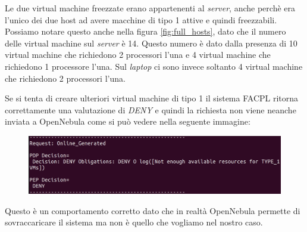 Le due virtual machine freezzate erano appartenenti al \emph{server}, anche perchè era l'unico dei due host ad avere macchine di tipo 1 attive e quindi freezzabili. Possiamo notare questo anche nella figura \ref{fig:full_hosts}, dato che il numero delle virtual machine sul \emph{server} è 14. Questo numero è dato dalla presenza di 10 virtual machine che richiedono 2 processori l'una e 4 virtual machine che richiedono 1 processore l'una. Sul \emph{laptop} ci sono invece soltanto 4 virtual machine che richiedono 2 processori l'una.\par
Se si tenta di creare ulteriori virtual machine di tipo 1 il sistema FACPL ritorna correttamente una valutazione di \emph{DENY} e quindi la richiesta non viene neanche inviata a OpenNebula come si può vedere nella seguente immagine:
\begin{figure}[H]
    \centering
    \includegraphics[width=\textwidth]{tesi_screenshot/notEnoughResources.png}
\end{figure}
Questo è un comportamento corretto dato che in realtà OpenNebula permette di sovraccaricare il sistema ma non è quello che vogliamo nel nostro caso.\par

